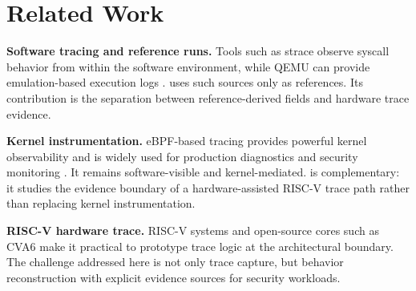 \section{Related Work}

\textbf{Software tracing and reference runs.} Tools such as strace observe
syscall behavior from within the software environment, while QEMU can provide
emulation-based execution logs \cite{strace,bellard-qemu}. \rvmt uses such
sources only as references. Its contribution is the separation between
reference-derived fields and hardware trace evidence.

\textbf{Kernel instrumentation.} eBPF-based tracing provides powerful kernel
observability and is widely used for production diagnostics and security
monitoring \cite{ebpf}. It remains software-visible and kernel-mediated. \rvmt is
complementary: it studies the evidence boundary of a hardware-assisted RISC-V
trace path rather than replacing kernel instrumentation.

\textbf{RISC-V hardware trace.} RISC-V systems and open-source cores such as
CVA6 make it practical to prototype trace logic at the architectural boundary.
The challenge addressed here is not only trace capture, but behavior
reconstruction with explicit evidence sources for security workloads.
